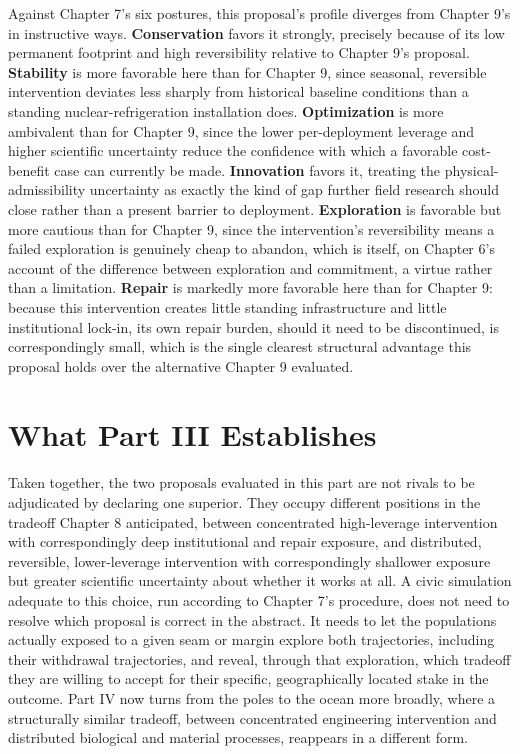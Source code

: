 \documentclass[11pt,oneside]{book}
\begin{document}
Against Chapter 7's six postures, this proposal's profile diverges from Chapter 9's in instructive ways. \textbf{Conservation} favors it strongly, precisely because of its low permanent footprint and high reversibility relative to Chapter 9's proposal. \textbf{Stability} is more favorable here than for Chapter 9, since seasonal, reversible intervention deviates less sharply from historical baseline conditions than a standing nuclear-refrigeration installation does. \textbf{Optimization} is more ambivalent than for Chapter 9, since the lower per-deployment leverage and higher scientific uncertainty reduce the confidence with which a favorable cost-benefit case can currently be made. \textbf{Innovation} favors it, treating the physical-admissibility uncertainty as exactly the kind of gap further field research should close rather than a present barrier to deployment. \textbf{Exploration} is favorable but more cautious than for Chapter 9, since the intervention's reversibility means a failed exploration is genuinely cheap to abandon, which is itself, on Chapter 6's account of the difference between exploration and commitment, a virtue rather than a limitation. \textbf{Repair} is markedly more favorable here than for Chapter 9: because this intervention creates little standing infrastructure and little institutional lock-in, its own repair burden, should it need to be discontinued, is correspondingly small, which is the single clearest structural advantage this proposal holds over the alternative Chapter 9 evaluated.

\section*{What Part III Establishes}

Taken together, the two proposals evaluated in this part are not rivals to be adjudicated by declaring one superior. They occupy different positions in the tradeoff Chapter 8 anticipated, between concentrated high-leverage intervention with correspondingly deep institutional and repair exposure, and distributed, reversible, lower-leverage intervention with correspondingly shallower exposure but greater scientific uncertainty about whether it works at all. A civic simulation adequate to this choice, run according to Chapter 7's procedure, does not need to resolve which proposal is correct in the abstract. It needs to let the populations actually exposed to a given seam or margin explore both trajectories, including their withdrawal trajectories, and reveal, through that exploration, which tradeoff they are willing to accept for their specific, geographically located stake in the outcome. Part IV now turns from the poles to the ocean more broadly, where a structurally similar tradeoff, between concentrated engineering intervention and distributed biological and material processes, reappears in a different form.
\end{document}
